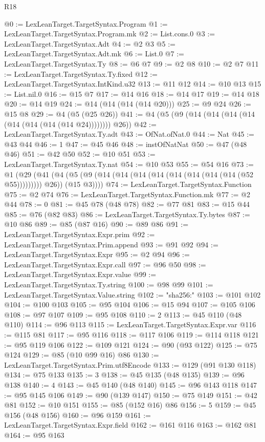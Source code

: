 \begin{lexlean}{R18}
\begin{coremodule}
@0 := LexLeanTarget.TargetSyntax.Program
@1 := LexLeanTarget.TargetSyntax.Program.mk
@2 := List.cons.{0}
@3 := LexLeanTarget.TargetSyntax.Adt
@4 := @2 @3
@5 := LexLeanTarget.TargetSyntax.Adt.mk
@6 := List.{0}
@7 := LexLeanTarget.TargetSyntax.Ty
@8 := @6 @7
@9 := @2 @8
@10 := @2 @7
@11 := LexLeanTarget.TargetSyntax.Ty.fixed
@12 := LexLeanTarget.TargetSyntax.IntKind.u32
@13 := @11 @12
@14 := @10 @13
@15 := List.nil.{0}
@16 := @15 @7
@17 := @14 @16
@18 := @14 @17
@19 := @14 @18
@20 := @14 @19
@24 := @14 (@14 (@14 (@14 @20)))
@25 := @9 @24
@26 := @15 @8
@29 := @4 (@5 (@25 @26))
@41 := @4 (@5 (@9 (@14 (@14 (@14 (@14 (@14 (@14 (@14 (@14 @24)))))))) @26))
@42 := LexLeanTarget.TargetSyntax.Ty.adt
@43 := OfNat.ofNat.{0}
@44 := Nat
@45 := @43 @44
@46 := 1
@47 := @45 @46
@48 := instOfNatNat
@50 := @47 (@48 @46)
@51 := @42 @50
@52 := @10 @51
@53 := LexLeanTarget.TargetSyntax.Ty.nat
@54 := @10 @53
@55 := @54 @16
@73 := @1
    (@29
      (@41 (@4 (@5 (@9 (@14 (@14 (@14 (@14 (@14 (@14 (@14 (@14 (@52 @55))))))))) @26)) (@15 @3))))
@74 := LexLeanTarget.TargetSyntax.Function
@75 := @2 @74
@76 := LexLeanTarget.TargetSyntax.Function.mk
@77 := @2 @44
@78 := 0
@81 := @45 @78 (@48 @78)
@82 := @77 @81
@83 := @15 @44
@85 := @76 (@82 @83)
@86 := LexLeanTarget.TargetSyntax.Ty.bytes
@87 := @10 @86
@89 := @85 (@87 @16)
@90 := @89 @86
@91 := LexLeanTarget.TargetSyntax.Expr.prim
@92 := LexLeanTarget.TargetSyntax.Prim.append
@93 := @91 @92
@94 := LexLeanTarget.TargetSyntax.Expr
@95 := @2 @94
@96 := LexLeanTarget.TargetSyntax.Expr.call
@97 := @96 @50
@98 := LexLeanTarget.TargetSyntax.Expr.value
@99 := LexLeanTarget.TargetSyntax.Ty.string
@100 := @98 @99
@101 := LexLeanTarget.TargetSyntax.Value.string
@102 := "sha256:"
@103 := @101 @102
@104 := @100 @103
@105 := @95 @104
@106 := @15 @94
@107 := @105 @106
@108 := @97 @107
@109 := @95 @108
@110 := 2
@113 := @45 @110 (@48 @110)
@114 := @96 @113
@115 := LexLeanTarget.TargetSyntax.Expr.var
@116 := @115 @81
@117 := @95 @116
@118 := @117 @106
@119 := @114 @118
@121 := @95 @119 @106
@122 := @109 @121
@124 := @90 (@93 @122)
@125 := @75 @124
@129 := @85 (@10 @99 @16) @86
@130 := LexLeanTarget.TargetSyntax.Prim.utf8Encode
@133 := @129 (@91 @130 @118)
@134 := @75 @133
@135 := 3
@138 := @45 @135 (@48 @135)
@139 := @96 @138
@140 := 4
@143 := @45 @140 (@48 @140)
@145 := @96 @143 @118
@147 := @95 @145 @106
@149 := @90 (@139 @147)
@150 := @75 @149
@151 := @42 @81
@152 := @10 @151
@155 := @85 (@152 @16) @86
@156 := 5
@159 := @45 @156 (@48 @156)
@160 := @96 @159
@161 := LexLeanTarget.TargetSyntax.Expr.field
@162 := @161 @116
@163 := @162 @81
@164 := @95 @163

\end{coremodule}
\end{lexlean}
